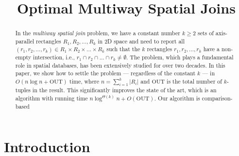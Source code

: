 \documentclass[sigconf]{acmart}
\def\out{\mathrm{OUT}}
\begin{document}
    
\title{Optimal Multiway Spatial Joins}


\author{}


\begin{abstract}
    In the {\em multiway spatial join} problem, we have a constant number $k \ge 2$ sets of axis-parallel rectangles $R_1, R_2, ..., R_k$ in 2D space and need to report all $(r_1, r_2, ..., r_k) \in R_1 \times R_2 \times ... \times R_k$ such that the $k$ rectangles $r_1, r_2, ..., r_k$ have a non-empty intersection, i.e., $r_1 \cap r_2 \cap ... \cap r_k \neq \emptyset$. The problem, which plays a fundamental role in spatial databases, has been extensively studied for over two decades. In this paper, we show how to settle the problem --- regardless of the constant $k$ --- in $O(n \log n + \out)$ time, where $n = \sum_{i=1}^k |R_i|$ and $\out$ is the total number of $k$-tuples in the result. This significantly improves the state of the art, which is an algorithm with running time $n \log^{\Theta(k)} n + O(\out)$. Our algorithm is comparison-based
\end{abstract}

\maketitle 

\section{Introduction} \label{sec:intro}



\balance

\end{document}
